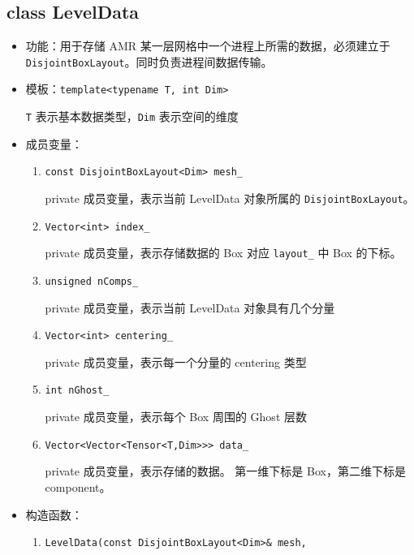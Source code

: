 \documentclass[cn, bibend=bibtex]{elegantpaper}
\theoremstyle{plain}
\begin{document}

\subsection{class LevelData}

\begin{itemize}
  \item 功能：用于存储 AMR 某一层网格中一个进程上所需的数据，必须建立于 \lstinline|DisjointBoxLayout|。同时负责进程间数据传输。
  \item 模板：\lstinline|template<typename T, int Dim>|

    \lstinline|T| 表示基本数据类型，\lstinline|Dim| 表示空间的维度
  \item 成员变量：
  \begin{enumerate}
    \item \lstinline|const DisjointBoxLayout<Dim> mesh_|

    private 成员变量，表示当前 LevelData 对象所属的 \lstinline|DisjointBoxLayout|。

    \item \lstinline|Vector<int> index_|

    private 成员变量，表示存储数据的 Box 对应 \lstinline|layout_| 中 Box 的下标。
    
    \item \lstinline|unsigned nComps_|

    private 成员变量，表示当前 LevelData 对象具有几个分量
    
    \item \lstinline|Vector<int> centering_|

    private 成员变量，表示每一个分量的 centering 类型

    \item \lstinline|int nGhost_|

    private 成员变量，表示每个 Box 周围的 Ghost 层数

    \item \lstinline|Vector<Vector<Tensor<T,Dim>>> data_|

    private 成员变量，表示存储的数据。
    第一维下标是 Box，第二维下标是 component。
  \end{enumerate}
  \item 构造函数：
  \begin{enumerate}
    \item \lstinline|LevelData(const DisjointBoxLayout<Dim>& mesh, |


\end{enumerate}
\end{itemize}
\end{document}
